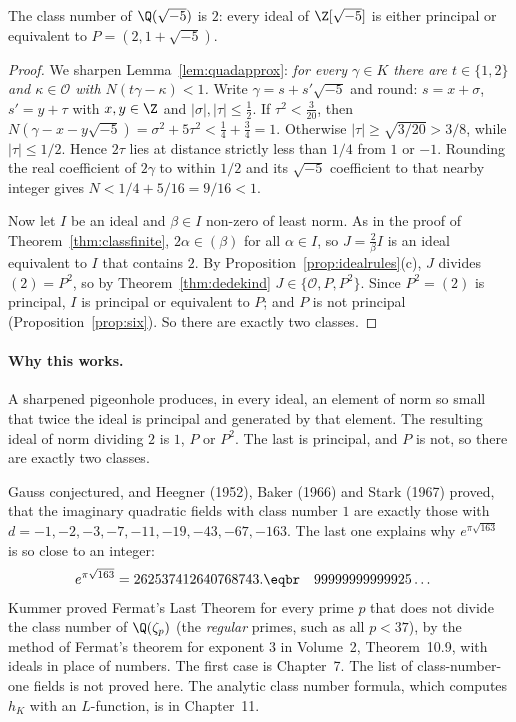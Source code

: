 \begin{theorem}\label{thm:hm5}
The class number of $\Q(\sqrt{-5})$ is $2$: every ideal of $\Z[\sqrt{-5}]$ is either principal or equivalent to $P=(2,1+\sqrt{-5})$.
\end{theorem}
\begin{proof}
We sharpen Lemma~\ref{lem:quadapprox}: \emph{for every $\gamma\in K$ there are $t\in\{1,2\}$ and $\kappa\in\mathcal O$ with $N(t\gamma-\kappa)<1$.} Write $\gamma=s+s'\sqrt{-5}$ and round: $s=x+\sigma$, $s'=y+\tau$ with $x,y\in\Z$ and $|\sigma|,|\tau|\le\frac12$. If $\tau^2<\frac3{20}$, then $N(\gamma-x-y\sqrt{-5})=\sigma^2+5\tau^2<\frac14+\frac34=1$. Otherwise $|\tau|\ge\sqrt{3/20}>3/8$, while $|\tau|\le1/2$. Hence $2\tau$ lies at distance strictly less than $1/4$ from $1$ or $-1$. Rounding the real coefficient of $2\gamma$ to within $1/2$ and its $\sqrt{-5}$ coefficient to that nearby integer gives $N<1/4+5/16=9/16<1$.

Now let $I$ be an ideal and $\beta\in I$ non-zero of least norm. As in the proof of Theorem~\ref{thm:classfinite}, $2\alpha\in(\beta)$ for all $\alpha\in I$, so $J=\frac2\beta I$ is an ideal equivalent to $I$ that contains $2$. By Proposition~\ref{prop:idealrules}(c), $J$ divides $(2)=P^2$, so by Theorem~\ref{thm:dedekind} $J\in\{\mathcal O,P,P^2\}$. Since $P^2=(2)$ is principal, $I$ is principal or equivalent to $P$; and $P$ is not principal (Proposition~\ref{prop:six}). So there are exactly two classes.
\end{proof}

\paragraph{Why this works.}
A sharpened pigeonhole produces, in every ideal, an element of norm so small that twice the ideal is principal and generated by that element. The resulting ideal of norm dividing $2$ is $1$, $P$ or $P^2$. The last is principal, and $P$ is not, so there are exactly two classes.

\begin{remark}
Gauss conjectured, and Heegner (1952), Baker (1966) and Stark (1967) proved, that the imaginary quadratic fields with class number $1$ are exactly those with $d=-1,-2,-3,-7,-11,-19,-43,-67,-163$. The last one explains why $e^{\pi\sqrt{163}}$ is so close to an integer:
\[\begin{aligned}e^{\pi\sqrt{163}}&=262537412640768743.\eqbr\quad99999999999925\ldots\end{aligned}\]
 Kummer proved Fermat's Last Theorem for every prime $p$ that does not divide the class number of $\Q(\zeta_p)$ (the \emph{regular} primes, such as all $p<37$), by the method of Fermat's theorem for exponent $3$ in Volume~2, Theorem~10.9, with ideals in place of numbers. The first case is Chapter~7. The list of class-number-one fields is not proved here. The analytic class number formula, which computes $h_K$ with an $L$-function, is in Chapter~11.
\end{remark}

